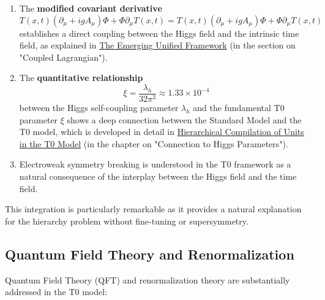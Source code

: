 \documentclass[12pt,a4paper]{article}
\newcommand{\Tfieldt}{T(x,t)}
\newcommand{\DhiggsTt}{\Tfieldt (\partial_\mu + ig A_\mu) \Phi + \Phi \partial_\mu \Tfieldt}
\begin{document}
	\begin{enumerate}
		\item The \textbf{modified covariant derivative}
		\begin{equation}
			\DhiggsTt = \Tfieldt (\partial_\mu + ig A_\mu) \Phi + \Phi \partial_\mu \Tfieldt
		\end{equation}
		establishes a direct coupling between the Higgs field and the intrinsic time field, as explained in \href{https://github.com/jpascher/T0-Time-Mass-Duality/tree/main/2/pdf/English/ausblicke_En.pdf}{The Emerging Unified Framework} (in the section on "Coupled Lagrangian").
		
		\item The \textbf{quantitative relationship}
		\begin{equation}
			\xi = \frac{\lambda_h}{32\pi^3} \approx 1.33 \times 10^{-4}
		\end{equation}
		between the Higgs self-coupling parameter $\lambda_h$ and the fundamental T0 parameter $\xi$ shows a deep connection between the Standard Model and the T0 model, which is developed in detail in \href{https://github.com/jpascher/T0-Time-Mass-Duality/tree/main/2/pdf/English/NatEinheitenSystematikEn.pdf}{Hierarchical Compilation of Units in the T0 Model} (in the chapter on "Connection to Higgs Parameters").
		
		\item Electroweak symmetry breaking is understood in the T0 framework as a natural consequence of the interplay between the Higgs field and the time field.
	\end{enumerate}
	
	This integration is particularly remarkable as it provides a natural explanation for the hierarchy problem without fine-tuning or supersymmetry.
	
	\subsection{Quantum Field Theory and Renormalization}
	\label{subsec:qft_renormalization}
	
	Quantum Field Theory (QFT) and renormalization theory are substantially addressed in the T0 model:
	
\end{document}
